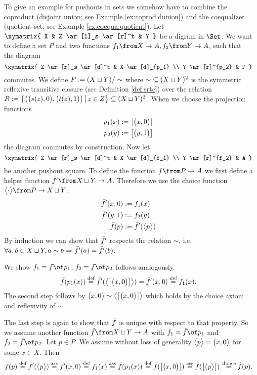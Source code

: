 \begin{example}
  \label{ex:pushout:set}
  To give an example for pushouts in sets we somehow have to combine the coproduct (disjoint union; see Example \ref{ex:coprod:dunion}) and the coequalizer (quotient set; see Example \ref{ex:coequa:quotient}).
  Let
  $ \xymatrix{
    X & Z \ar[l]_s \ar[r]^t & Y
  } $
  be a digram in $\Set$.
  We want to define a set $P$ and two functions $f_1 \from X \to A, f_2 \from Y \to A$, such that the diagram
  \[ \xymatrix{
    Z \ar[r]_s \ar[d]^t & X \ar[d]_{p_1} \\
    Y \ar[r]^{p_2} & P
  } \]
  commutes.
  We define $P := (X \sqcup Y) / \sim$ where $\sim \; \subseteq (X \sqcup Y)^2$ is the symmetric reflexive transitive closure (see Definition \ref{def:srtc}) over the relation
  $R := \bigl \{ \bigl( \bigl( s(z) , 0 \bigr) , \bigl( t(z) , 1 \bigr) \bigr) \,\big|\, z \in Z \bigr \} \subseteq (X \sqcup Y)^2$.
  When we choose the projection functions
  \begin{alignat*}{2}
    p_1(x) &:= \bigl[ \bigl( x , 0 \bigr) \bigr] \\
    p_2(y) &:= \bigl[ \bigl( y , 1 \bigr) \bigr]
  \end{alignat*}
  the diagram commutes by construction. Now let
  \[ \xymatrix{
    Z \ar[r]_s \ar[d]^t & X \ar[d]_{f_1} \\
    Y \ar[r]^{f_2} & A
  } \]
  be another pushout square. To define the function $\fbar \from P \to A$ we first define a helper function $\fbar' \from X \dunion Y \to A$.
  Therefore we use the choice function
  $\choice \cdot \from P \to X \dunion Y$:
  \begin{alignat*}{2}
    \bar{f}'(x, 0) &:= f_1(x) \\
    \bar{f}'(y, 1) &:= f_2(y) \\
    \bar{f}(p)     &:= \bar{f}'(\bigl< p \bigr>)
  \end{alignat*}
  By induction we can show that $\bar{f}'$ respects the relation $\sim$, i.e. $\forall a,b \in X \sqcup Y, a \sim b \Rightarrow \bar{f}'(a) = \bar{f}'(b)$.

  We show $f_1 = \fbar \of p_1$; $f_2 = \fbar \of p_2$ follows analogously.
  $$\bar{f}(p_1(x)) \stackrel{\text{def}}{=} \bar{f}'(\bigl< \bigl[ \bigl( x , 0 \bigr) \bigr] \bigr>) = \bar{f}'(x, 0) \stackrel{\text{def}}{=} f_1(x).$$
  The second step follows by $\bigl( x , 0 \bigr) \sim \bigl< \bigl[ \bigl( x , 0 \bigr) \bigr] \bigr>$ which holds by the choice axiom and reflexivity of $\sim$.

  The last step is again to show that $\bar{f}$ is unique with respect to that property. So we assume another function $\ftilde \from X \dunion Y \to A$ with $f_1 = \ftilde \of p_1$ and $f_2 = \ftilde \of p_2$.
  Let $p \in P$. We assume without loss of generality $\bigl< p \bigr> = \bigl( x , 0 \bigr)$ for some $x \in X$. Then
  $$\bar{f}(p)
    \stackrel{\text{def}}{=} \bar{f}'(\bigl< p \bigr>)
    \stackrel{\text{ass}}{=} \bar{f}'(x, 0)
    \stackrel{\text{def}}{=} f_1(x)
    \stackrel{\text{ass}}{=} \tilde{f}(p_1(x)) \stackrel{\text{def}}{=} \tilde{f}(\bigl[ \bigl( x , 0 \bigr) \bigr])
    \stackrel{\text{ass}}{=} \tilde{f}(\bigl[ \bigl< p \bigr> \bigr])
    \stackrel{\text{choice}}{=} \tilde{f}(p).$$
\end{example}


